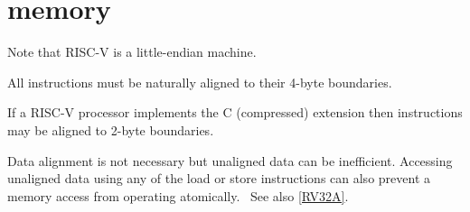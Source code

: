 \section{memory}

Note that RISC-V is a little-endian machine.  

All instructions must be naturally aligned to their 4-byte 
boundaries.~\cite[p.~5]{rvismv1v22:2017}

If a RISC-V processor implements the C (compressed) extension then 
instructions may be aligned to 2-byte 
boundaries.\cite[p.~68]{rvismv1v22:2017}

Data alignment is not necessary but unaligned data can be inefficient.  
Accessing unaligned data using any of the load or store instructions can 
also prevent a memory access from operating 
atomically.~\cite[p.19]{rvismv1v22:2017}  See also \autoref{RV32A}.



%


